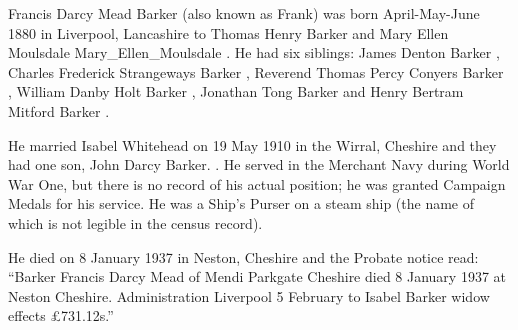 
Francis Darcy Mead Barker (also known as Frank)  was born April-May-June 1880 in Liverpool, Lancashire to Thomas Henry Barker  and Mary Ellen Moulsdale {Mary_Ellen_Moulsdale}  \cite{FBarkerBirth}. He had six siblings: James Denton Barker , Charles Frederick Strangeways Barker , Reverend Thomas Percy Conyers Barker , William Danby Holt Barker , Jonathan Tong Barker  and Henry Bertram Mitford Barker .

He married Isabel Whitehead  on 19 May 1910 in the Wirral, Cheshire \cite{FBarkerMarriage} and they had one son, John Darcy Barker. .
He served in the Merchant Navy during World War One, but there is no record of his actual position;  he was granted Campaign Medals for his service. \cite{FDMBarkerMedals}
He was a Ship's Purser on a steam ship (the name of which is not legible in the census record). \cite{FBarkerOccupation}

He died on 8 January 1937 in	Neston, Cheshire \cite{FBarkerDeath} and the Probate notice read:
``Barker Francis Darcy Mead of Mendi Parkgate Cheshire died 8 January 1937 at Neston Cheshire.
Administration Liverpool 5 February to Isabel Barker widow effects \pounds 731.12s.''
